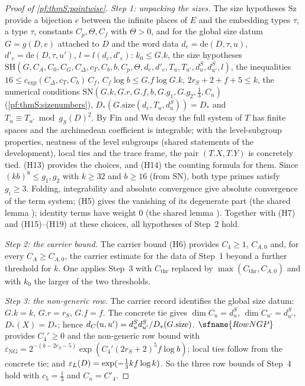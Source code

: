 \begin{proof}[Proof of \cref{pf:thmS:pointwise}]
\emph{Step 1: unpacking the sizes.}
The size hypotheses $\mathrm{Sz}$ provide a bijection $e$ between the infinite places of $E$ and the embedding
types $\tau$, a type $\tau$, constants $C_p,\Theta,C_f$ with $\Theta>0$, and for the global size datum $G=g(D,e)$
attached to $D$ and the word data $d_e=\mathrm{de}(D,\tau,u)$, $d'_e=\mathrm{de}(D,\tau,u')$, $l=l(d_e,d'_e)$: $k_0\le
G.k$, the size hypotheses $\mathrm{SH}(G,C_A,C_0,C_G,C_\Delta,c_T,C_b,b,C_p,\Theta,d_e,d'_e,T_u,T_{u'},d^S_u,
d^S_{u'},l)$, the inequalities $16\le c_{\exp}(C_\Delta,c_T,C_b)\,C_f$, $C_f\log b\le G.f\log G.k$, $2r_S+2+f+5\le k$,
the numerical conditions $\mathrm{SN}(G.k,G.r,G.f,b,G.g_1,G.g_2,\frac13,C_n)$ (\cref{pf:thmS:sizenumbers}),
$D_*(G.\mathrm{size}(d_e,T_u,d^S_u))=D_*$ and $T_u\equiv T_{u'}\bmod g_S(D)^2$. By $\mathrm{Fin}$ and Wu decay the
full system of $T$ has finite spaces and the archimedean coefficient is integrable; with the level-subgroup properties,
neatness of the level subgroups (shared statements of the development), local ties and the trace frame, the pair
$(T.X,T.Y)$ is concretely tied. (H13) provides the choices, and (H14) the counting formula for them. Since $(kb)^8\le g_1,g_2$ with $k\ge32$ and $b\ge16$ (from $\mathrm{SN}$), both type
primes satisfy $g_i\ge3$. Folding, integrability and absolute convergence give absolute convergence of the term
system; (H5) gives the vanishing of its degenerate part (the shared lemma
); identity terms have weight $0$ (the shared lemma
). Together with (H7) and (H15)--(H19) at these
choices, all hypotheses of Step~2 hold.

\emph{Step 2: the carrier bound.}
The carrier bound (H6) provides $C_4\ge1$, $C_{A,0}$ and, for every $C_A\ge C_{A,0}$, the carrier estimate for the data of Step~1 beyond a further threshold for $k$. One applies Step~3 with
$C_{\mathrm{thr}}$ replaced by $\max(C_{\mathrm{thr}},C_{A,0})$ and with $k_0$ the larger of the two thresholds.

\emph{Step 3: the non-generic row.}
The carrier record identifies the global size datum: $G.k=k$, $G.r=r_S$, $G.f=f$. The concrete tie gives
$\dim C_u=d^S_u$, $\dim C_{u'}=d^S_{u'}$, $D_*(X)=D_*$; hence $d_{C}(u,u')=d^S_ud^S_{u'}/D_*(G.\mathrm{size})$.
$\sfname{RowNGP}$ provides $C_4'\ge0$ and the non-generic row bound with
$\varepsilon_{\mathrm{NG}}=2^{-(k-2r_S-5)}\exp(C_4'(2r_S+2)^5f\log b)$; local ties follow from the concrete tie; and
$\varepsilon_{L}(D)=\exp(-\frac13 kf\log k)$. So the three row bounds of Step~4 hold with $c_5=\frac13$ and $C_n=C'_4$.


\end{proof}
